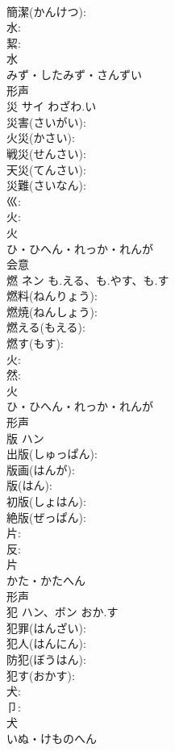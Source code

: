 \documentclass[8pt]{extreport}
\begin{document}
\begin{CJK}{UTF8}{min}
\\	簡潔(かんけつ): 
\\	水: 
\\	絜: 
\\	水	
\\	みず・したみず・さんずい	
\\	形声 
\\	災	サイ	わざわ.い		
\\	災害(さいがい): 
\\	火災(かさい): 
\\	戦災(せんさい): 
\\	天災(てんさい): 
\\	災難(さいなん): 
\\	巛: 
\\	火: 
\\	火	
\\	ひ・ひへん・れっか・れんが	
\\	会意 
\\	燃	ネン	も.える、も.やす、も.す		
\\	燃料(ねんりょう): 
\\	燃焼(ねんしょう): 
\\	燃える(もえる): 
\\	燃す(もす): 
\\	火: 
\\	然: 
\\	火	
\\	ひ・ひへん・れっか・れんが	
\\	形声 
\\	版	ハン			
\\	出版(しゅっぱん): 
\\	版画(はんが): 
\\	版(はん): 
\\	初版(しょはん): 
\\	絶版(ぜっぱん): 
\\	片: 
\\	反: 
\\	片	
\\	かた・かたへん	
\\	形声 
\\	犯	ハン、ボン	おか.す		
\\	犯罪(はんざい): 
\\	犯人(はんにん): 
\\	防犯(ぼうはん): 
\\	犯す(おかす): 
\\	犬: 
\\	卩: 
\\	犬	
\\	いぬ・けものへん	

\end{CJK}
\end{document}
